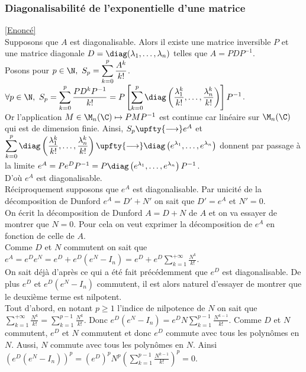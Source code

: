 \documentclass[8pt]{book}
\begin{document}
	\subsubsection{Diagonalisabilité de l'exponentielle d'une matrice }
	\label{Diagonalisabilité de l'exponentielle d'une matrice corrigé}
	\textcolor{blue}{\hyperref[Diagonalisabilité de l'exponentielle d'une matrice]{[Enoncé]}}\\
	Supposons que $A$ est diagonalisable. Alors il existe une matrice inversible $P$ et une matrice diagonale $D=\diag(\lambda_1,\dots,\lambda_n)$ telles que $A=PDP^{-1}$.\\
	Posons pour $p\in \N,\ S_p=\displaystyle\sum_{k=0}^p\frac{A^k}{k!}$.\\
	$\forall p\in \N,\ S_p=\displaystyle\sum_{k=0}^p\frac{PD^kP^{-1}}{k!}=P\left[\sum_{k=0}^p\diag\left(\displaystyle\frac{\lambda_1^k}{k!},\dots,\frac{\lambda_n^k}{k!}\right)\right]P^{-1}$.\\
	Or l'application $M\in \M_n(\C)\mapsto PMP^{-1}$ est continue car linéaire sur $\M_n(\C)$ qui est de dimension finie. Ainsi, $S_p\upfty{\longrightarrow}e^A$ et $\displaystyle\sum_{k=0}^p\diag\left(\displaystyle\frac{\lambda_1^k}{k!},\dots,\frac{\lambda_n^k}{k!}\right)\upfty{\longrightarrow}\diag\left(e^{\lambda_1},\dots,e^{\lambda_n}\right)$ donnent par passage à la limite $e^A=Pe^DP^{-1}=P\diag\left(e^{\lambda_1},\dots,e^{\lambda_n}\right)P^{-1}$.\\
	D'où $e^A$ est diagonalisable.\\
	Réciproquement supposons que $e^A$ est diagonalisable. Par unicité de la décomposition de Dunford $e^A=D'+N'$ on sait que $D'=e^A$ et $N'=0$.\\
	On écrit la décomposition de Dunford $A=D+N$ de $A$ et on va essayer de montrer que $N=0$. Pour cela on veut exprimer la décomposition de $e^A$ en fonction de celle de $A$.\\
	Comme $D$ et $N$ commutent on sait que $e^A=e^De^N=e^D+e^D(e^N-I_n)=e^D+e^D\displaystyle\sum_{k=1}^{+\infty}\frac{N^k}{k!}$.\\
	On sait déjà d'après ce qui a été fait précédemment que $e^D$ est diagonalisable. De plus $e^D$ et $e^D(e^N-I_n)$ commutent, il est alors naturel d'essayer de montrer que le deuxième terme est nilpotent.\\
	Tout d'abord, en notant $p\geq 1$ l'indice de nilpotence de $N$ on sait que $\displaystyle\sum_{k=1}^{+\infty}\frac{N^k}{k!}=\sum_{k=1}^{p-1}\frac{N^k}{k!}$. Donc $e^D(e^N-I_n)=e^DN\displaystyle\sum_{k=1}^{p-1}\frac{N^{k-1}}{k!}$. Comme $D$ et $N$ commutent, $e^D$ et $N$ commutent et donc $e^D$ commute avec tous les polynômes en $N$. Aussi, $N$ commute avec tous les polynômes en $N$. Ainsi $\left(e^D(e^N-I_n)\right)^p=\left(e^D\right)^pN^p\left(\displaystyle\sum_{k=1}^{p-1}\frac{N^{k-1}}{k!}\right)^p=0$.\\
\end{document}

